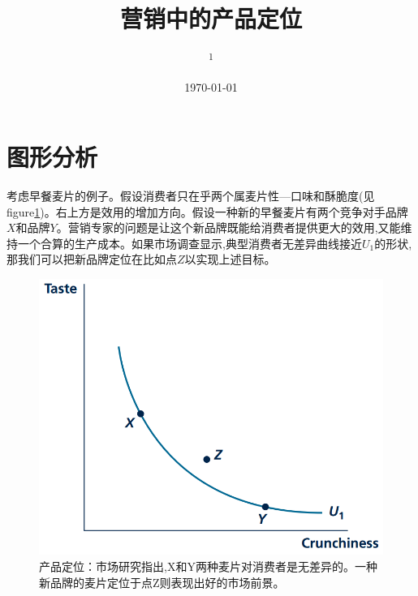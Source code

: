 \documentclass[10pt, a4paper]{ctexart} %
\title{营销中的产品定位} %
\author{
	\authorstyle{鲁晓东\textsuperscript{1}} %
	\newline\newline %
	\textsuperscript{1}\institution{中山大学岭南学院经济学系}\\ %
}
\date{\today} %
\begin{document}
\maketitle %

\thispagestyle{firstpage} %


	
	







\section*{图形分析}



考虑早餐麦片的例子。假设消费者只在乎两个属麦片性—口味和酥脆度(见figure\ref{positioning})。右上方是效用的增加方向。假设一种新的早餐麦片有两个竞争对手品牌$X$和品牌$Y$。营销专家的问题是让这个新品牌既能给消费者提供更大的效用,又能维持一个合算的生产成本。如果市场调查显示,典型消费者无差异曲线接近$U_1$的形状,那我们可以把新品牌定位在比如点$Z$以实现上述目标。

\begin{figure}[ht]
	\centering
	\includegraphics[scale=0.4]{fig//positioning.png} %
	\caption{产品定位：市场研究指出,X和Y两种麦片对消费者是无差异的。一种新品牌的麦片定位于点Z则表现出好的市场前景。} %
	\label{positioning} %
\end{figure}
\end{document}
